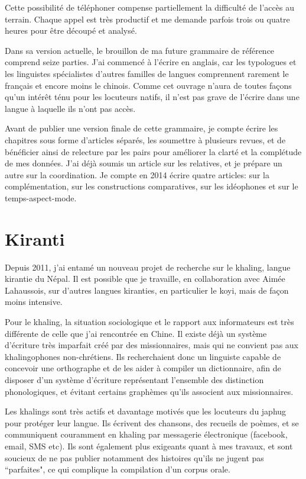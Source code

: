 \documentclass[oldfontcommands,oneside,a4paper,11pt]{memoir}
\begin{document}
Cette possibilité de téléphoner compense partiellement la difficulté de l'accès au terrain. Chaque appel est très productif et me demande parfois trois ou quatre heures pour être découpé et analysé.  

Dans sa version actuelle, le brouillon de ma future grammaire de référence comprend seize parties.  J'ai commencé à l'écrire en anglais, car les typologues et les linguistes spécialistes d'autres familles de langues comprennent rarement le français et encore moins le chinois. Comme cet ouvrage n'aura de toutes façons qu'un intérêt ténu pour les locuteurs natifs, il n'est pas grave de l'écrire dans une langue à laquelle ils n'ont pas accès.  

Avant de publier une version finale de cette grammaire, je compte écrire les chapitres sous forme d'articles séparés, les soumettre à plusieurs revues, et de bénéficier ainsi de relecture par les pairs pour améliorer la clarté et la complétude de mes données. J'ai déjà soumis un article sur les relatives, et je prépare un autre sur la coordination. Je compte en 2014 écrire quatre articles:   sur la complémentation, sur les constructions comparatives, sur les idéophones et sur le temps-aspect-mode.

\section{Kiranti}
Depuis 2011, j'ai entamé un nouveau projet de recherche sur le khaling, langue kirantie du Népal. Il est possible que je travaille, en collaboration avec Aimée Lahaussois, sur d'autres langues kiranties, en particulier le koyi, mais   de façon moins intensive.

Pour le khaling, la situation sociologique et le rapport aux informateurs est très différente de celle que j'ai rencontrée en Chine. Il existe déjà un système d'écriture très imparfait créé par des missionnaires, mais qui ne convient pas aux khalingophones non-chrétiens. Ils recherchaient donc un linguiste  capable de concevoir une orthographe et de les aider à compiler un dictionnaire, afin de disposer d'un système d'écriture représentant l'ensemble des distinction phonologiques, et évitant certains graphèmes qu'ils associent aux missionnaires. 

Les khalings sont très actifs et davantage motivés que les locuteurs du japhug pour protéger leur langue. Ils écrivent des chansons, des recueils de poèmes, et se communiquent couramment en khaling par messagerie électronique (facebook, email, SMS etc). Ils sont également plus exigeants quant à mes travaux, et sont soucieux de ne pas publier notamment des histoires qu'ils ne jugent pas ``parfaites", ce qui complique la compilation d'un corpus orale.
\end{document}
